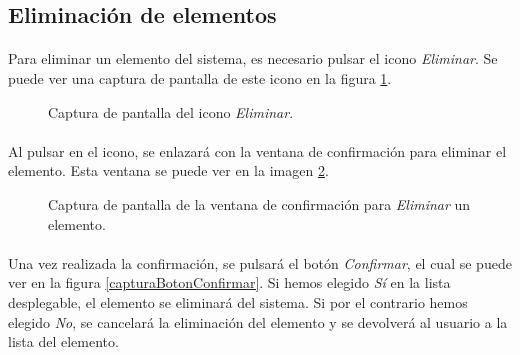 \subsection{Eliminación de elementos}

  \paragraph{}Para eliminar un elemento del sistema,  es necesario pulsar el
  icono \textit{Eliminar}. Se puede ver una captura de pantalla de este
  icono en la figura \ref{capturaDelElemento}.

  \begin{figure}[!ht]
    \begin{center}
      \caption{Captura de pantalla del icono \textit{Eliminar}.}
      \label{capturaDelElemento}
    \end{center}
  \end{figure}

  \paragraph{}Al pulsar en el icono, se enlazará con la ventana de confirmación
  para eliminar el elemento. Esta ventana se puede ver en la imagen
  \ref{capturaConfirmacion}.

  \begin{figure}[!ht]
    \begin{center}
      \caption{Captura de pantalla de la ventana de confirmación para \textit{Eliminar} un elemento.}
      \label{capturaConfirmacion}
    \end{center}
  \end{figure}

  \paragraph{}Una vez realizada la confirmación, se pulsará el botón
  \textit{Confirmar}, el cual se puede ver en la figura
  \ref{capturaBotonConfirmar}. Si hemos elegido \textit{Sí} en la lista
  desplegable, el elemento se eliminará del sistema. Si por el contrario hemos
  elegido \textit{No}, se cancelará la eliminación del elemento y se devolverá
  al usuario a la lista del elemento.

